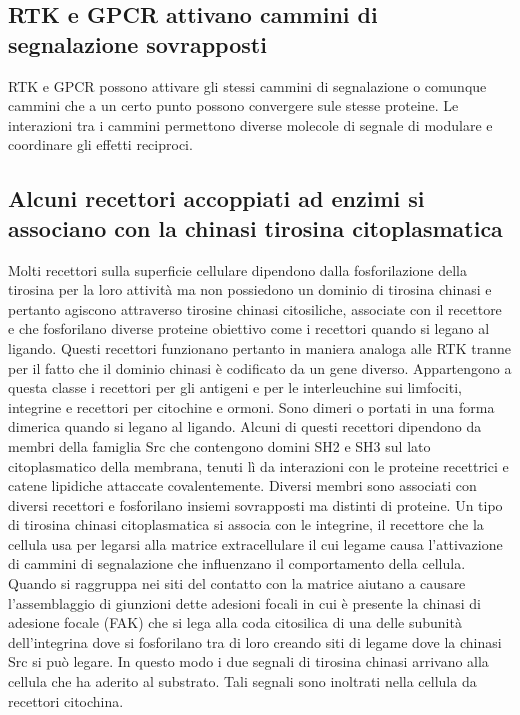 \subsection{RTK e GPCR attivano cammini di segnalazione sovrapposti}
RTK e GPCR possono attivare gli stessi cammini di segnalazione o comunque cammini che a un certo punto possono convergere sule stesse proteine. Le interazioni tra i cammini 
permettono diverse molecole di segnale di modulare e coordinare gli effetti reciproci. 
\subsection{Alcuni recettori accoppiati ad enzimi si associano con la chinasi tirosina citoplasmatica}
Molti recettori sulla superficie cellulare dipendono dalla fosforilazione della tirosina per la loro attivit\`a ma non possiedono un dominio di tirosina chinasi e pertanto agiscono
attraverso tirosine chinasi citosiliche, associate con il recettore e che fosforilano diverse proteine obiettivo come i recettori quando si legano al ligando. Questi recettori funzionano
pertanto in maniera analoga alle RTK tranne per il fatto che il dominio chinasi \`e codificato da un gene diverso. Appartengono a questa classe i recettori per gli antigeni e per le
interleuchine sui limfociti, integrine e recettori per citochine e ormoni. Sono dimeri o portati in una forma dimerica quando si legano al ligando. Alcuni di questi recettori dipendono
da membri della famiglia Src che contengono domini SH2 e SH3 sul lato citoplasmatico della membrana, tenuti l\`i da interazioni con le proteine recettrici e catene lipidiche attaccate
covalentemente. Diversi membri sono associati con diversi recettori e fosforilano insiemi sovrapposti ma distinti di proteine. Un tipo di tirosina chinasi citoplasmatica si associa con 
le integrine, il recettore che la cellula usa per legarsi alla matrice extracellulare il cui legame causa l'attivazione di cammini di segnalazione che influenzano il comportamento della
cellula. Quando si raggruppa nei siti del contatto con la matrice aiutano a causare l'assemblaggio di giunzioni dette adesioni focali in cui \`e presente la chinasi di adesione focale
(FAK) che si lega alla coda citosilica di una delle subunit\`a dell'integrina dove si fosforilano tra di loro creando siti di legame dove la chinasi Src si pu\`o legare. In questo
modo i due segnali di tirosina chinasi arrivano alla cellula che ha aderito al substrato. Tali segnali sono inoltrati nella cellula da recettori citochina.
